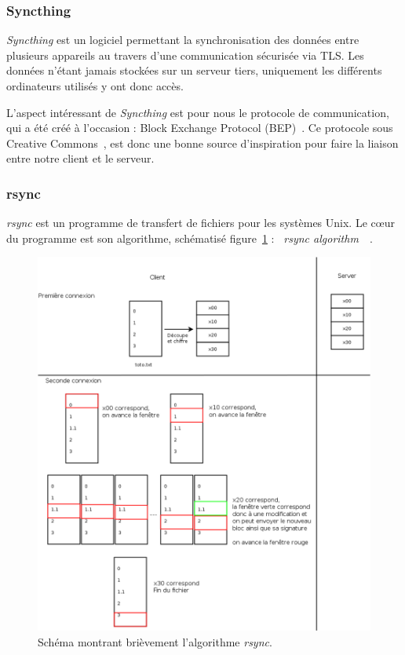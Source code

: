 \documentclass[a4paper,10pt, twoside]{report}
\begin{document}
\begin{spacing}{1.2}
\subsubsection{Syncthing}

\textit{Syncthing} est un logiciel permettant la synchronisation des données
entre plusieurs appareils au travers d'une communication sécurisée via TLS.
Les données n'étant jamais stockées sur un serveur tiers, uniquement les
différents ordinateurs utilisés y ont donc accès.

L'aspect intéressant de \textit{Syncthing} est pour nous le protocole de
communication, qui a été créé à l'occasion : Block Exchange Protocol
(BEP)~\cite{refBEP}. Ce protocole sous Creative Commons~\cite{refCC4.0}, est
donc une bonne source d'inspiration pour faire la liaison entre notre client
et le serveur.

\subsubsection{rsync}

\textit{rsync} est un programme de transfert de fichiers pour les systèmes
Unix. Le c\oe ur du programme est son algorithme, schématisé
figure~\ref{rsyncAlgo} :
\textit{\flqq~rsync algorithm~\frqq}~\cite{refRsyncAlgo}.

\begin{figure}[h!]
    \centering
    \includegraphics[width=15cm]{algo/rsyncalgo.png}
    \caption{\label{rsyncAlgo} Schéma montrant brièvement
    l'algorithme \textit{rsync}.}
\end{figure}


\end{spacing}
\end{document}
